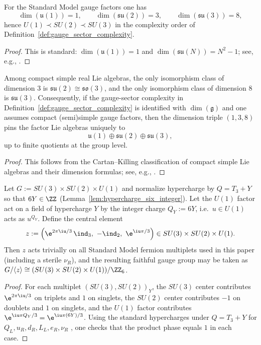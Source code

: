 \begin{lemma}\label{lem:gauge_dim_order}
For the Standard Model gauge factors one has
\[
\dim(\mathfrak{u}(1))=1,\qquad \dim(\mathfrak{su}(2))=3,\qquad \dim(\mathfrak{su}(3))=8,
\]
hence $U(1)\prec SU(2)\prec SU(3)$ in the complexity order of Definition~\ref{def:gauge_sector_complexity}.
\end{lemma}
\begin{proof}
This is standard: $\dim(\mathfrak{u}(1))=1$ and $\dim(\mathfrak{su}(N))=N^2-1$; see, e.g., \cite{PeskinSchroeder1995}.
\end{proof}

\begin{lemma}\label{lem:su2_su3_unique_by_dim}
Among compact simple real Lie algebras, the only isomorphism class of dimension $3$ is $\mathfrak{su}(2)\cong\mathfrak{so}(3)$, and the only isomorphism class of dimension $8$ is $\mathfrak{su}(3)$.
Consequently, if the gauge-sector complexity in Definition~\ref{def:gauge_sector_complexity} is identified with $\dim(\mathfrak{g})$ and one assumes compact (semi)simple gauge factors, then the dimension triple $(1,3,8)$ pins the factor Lie algebras uniquely to
\[
\mathfrak{u}(1)\oplus \mathfrak{su}(2)\oplus \mathfrak{su}(3),
\]
up to finite quotients at the group level.
\end{lemma}
\begin{proof}
This follows from the Cartan--Killing classification of compact simple Lie algebras and their dimension formulas; see, e.g., \cite{HallLieGroups2015,FultonHarris1991RepresentationTheory}.
\end{proof}

\begin{lemma}\label{lem:sm_global_gauge_group_z6}
Let $G:=SU(3)\times SU(2)\times U(1)$ and normalize hypercharge by $Q=T_3+Y$ so that $6Y\in\ZZ$ (Lemma~\ref{lem:hypercharge_six_integer}).
Let the $U(1)$ factor act on a field of hypercharge $Y$ by the integer charge $Q_Y:=6Y$, i.e.\ $u\in U(1)$ acts as $u^{Q_Y}$.
Define the central element
\[
z:=\left(\e^{2\pi\iu/3}\,\ind_3,\ -\ind_2,\ \e^{\iu\pi/3}\right)\in SU(3)\times SU(2)\times U(1).
\]
Then $z$ acts trivially on all Standard Model fermion multiplets used in this paper (including a sterile $\nu_R$), and the resulting faithful gauge group may be taken as $G/\langle z\rangle\cong (SU(3)\times SU(2)\times U(1))/\ZZ_6$.
\end{lemma}
\begin{proof}
For each multiplet $(SU(3),SU(2))_Y$, the $SU(3)$ center contributes $\e^{2\pi\iu/3}$ on triplets and $1$ on singlets, the $SU(2)$ center contributes $-1$ on doublets and $1$ on singlets, and the $U(1)$ factor contributes $\e^{\iu\pi Q_Y/3}=\e^{\iu\pi(6Y)/3}$.
Using the standard hypercharges under $Q=T_3+Y$ for $Q_L,u_R,d_R,L_L,e_R,\nu_R$ \cite{PeskinSchroeder1995,PDGRPP2024}, one checks that the product phase equals $1$ in each case.
\end{proof}


